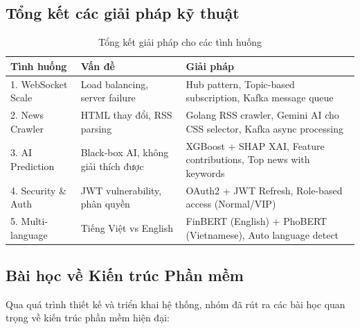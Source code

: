 \subsection{Tổng kết các giải pháp kỹ thuật}

\begin{table}[H]
\centering
\caption{Tổng kết giải pháp cho các tình huống}
\begin{tabular}{|p{3cm}|p{4cm}|p{5.5cm}|}
\hline
\textbf{Tình huống} & \textbf{Vấn đề} & \textbf{Giải pháp} \\
\hline
1. WebSocket Scale & Load balancing, server failure & Hub pattern, Topic-based subscription, Kafka message queue \\
\hline
2. News Crawler & HTML thay đổi, RSS parsing & Golang RSS crawler, Gemini AI cho CSS selector, Kafka async processing \\
\hline
3. AI Prediction & Black-box AI, không giải thích được & XGBoost + SHAP XAI, Feature contributions, Top news with keywords \\
\hline
4. Security \& Auth & JWT vulnerability, phân quyền & OAuth2 + JWT Refresh, Role-based access (Normal/VIP) \\
\hline
5. Multi-language & Tiếng Việt vs English & FinBERT (English) + PhoBERT (Vietnamese), Auto language detect \\
\hline
\end{tabular}
\end{table}

\subsection{Bài học về Kiến trúc Phần mềm}

Qua quá trình thiết kế và triển khai hệ thống, nhóm đã rút ra các bài học quan trọng về kiến trúc phần mềm hiện đại:

